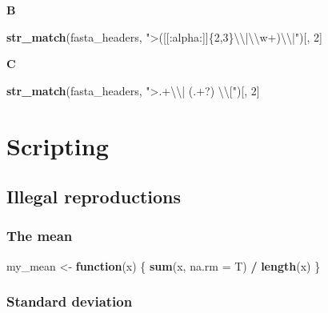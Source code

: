 \documentclass[]{book}
\newenvironment{Shaded}{\begin{snugshade}}{\end{snugshade}}
\newcommand{\CharTok}[1]{\textcolor[rgb]{0.31,0.60,0.02}{#1}}
\newcommand{\ControlFlowTok}[1]{\textcolor[rgb]{0.13,0.29,0.53}{\textbf{#1}}}
\newcommand{\DataTypeTok}[1]{\textcolor[rgb]{0.13,0.29,0.53}{#1}}
\newcommand{\DecValTok}[1]{\textcolor[rgb]{0.00,0.00,0.81}{#1}}
\newcommand{\KeywordTok}[1]{\textcolor[rgb]{0.13,0.29,0.53}{\textbf{#1}}}
\newcommand{\NormalTok}[1]{#1}
\newcommand{\OperatorTok}[1]{\textcolor[rgb]{0.81,0.36,0.00}{\textbf{#1}}}
\newcommand{\StringTok}[1]{\textcolor[rgb]{0.31,0.60,0.02}{#1}}
\begin{document}
\textbf{B}

\begin{Shaded}
\begin{Highlighting}[]
\KeywordTok{str_match}\NormalTok{(fasta_headers, }\StringTok{">([[:alpha:]]\{2,3\}}\CharTok{\textbackslash{}\textbackslash{}}\StringTok{|}\CharTok{\textbackslash{}\textbackslash{}}\StringTok{w+)}\CharTok{\textbackslash{}\textbackslash{}}\StringTok{|"}\NormalTok{)[, }\DecValTok{2}\NormalTok{]}
\end{Highlighting}
\end{Shaded}

\textbf{C}

\begin{Shaded}
\begin{Highlighting}[]
\KeywordTok{str_match}\NormalTok{(fasta_headers, }\StringTok{">.+}\CharTok{\textbackslash{}\textbackslash{}}\StringTok{| (.+?) }\CharTok{\textbackslash{}\textbackslash{}}\StringTok{["}\NormalTok{)[, }\DecValTok{2}\NormalTok{]}
\end{Highlighting}
\end{Shaded}

\hypertarget{scripting-3}{%
\section{Scripting}\label{scripting-3}}

\hypertarget{illegal-reproductions-1}{%
\subsection{Illegal reproductions}\label{illegal-reproductions-1}}

\hypertarget{the-mean-1}{%
\subsubsection*{The mean}\label{the-mean-1}}

\begin{Shaded}
\begin{Highlighting}[]
\NormalTok{my_mean <-}\StringTok{ }\ControlFlowTok{function}\NormalTok{(x) \{}
        \KeywordTok{sum}\NormalTok{(x, }\DataTypeTok{na.rm =}\NormalTok{ T) }\OperatorTok{/}\StringTok{ }\KeywordTok{length}\NormalTok{(x)}
\NormalTok{\}}
\end{Highlighting}
\end{Shaded}

\hypertarget{standard-deviation-1}{%
\subsubsection*{Standard deviation}\label{standard-deviation-1}}
\end{document}
